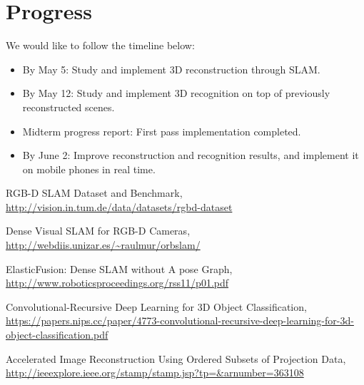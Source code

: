 \documentclass[dvips,12pt]{article}
\begin{document}
\section{Progress}
We would like to follow the timeline below:
\begin{itemize}[nolistsep]
\item By May 5: Study and implement 3D reconstruction through SLAM.
\item By May 12: Study and implement 3D recognition on top of previously reconstructed scenes.
\item Midterm progress report: First pass implementation completed.
\item By June 2: Improve reconstruction and recognition results, and implement it on mobile phones in real time.
\end{itemize}

\begin{thebibliography}{9}
RGB-D SLAM Dataset and Benchmark,
\\\url{http://vision.in.tum.de/data/datasets/rgbd-dataset}

Dense Visual SLAM for RGB-D Cameras,
\\\url{http://webdiis.unizar.es/~raulmur/orbslam/}

ElasticFusion: Dense SLAM without A pose Graph,  \\\url{http://www.roboticsproceedings.org/rss11/p01.pdf}

Convolutional-Recursive Deep Learning for 3D Object Classification,
\\\url{https://papers.nips.cc/paper/4773-convolutional-recursive-deep-learning-for-3d-object-classification.pdf}

Accelerated Image Reconstruction Using Ordered Subsets of Projection Data,
\\\url{http://ieeexplore.ieee.org/stamp/stamp.jsp?tp=&arnumber=363108}

\end{thebibliography}
\end{document}
